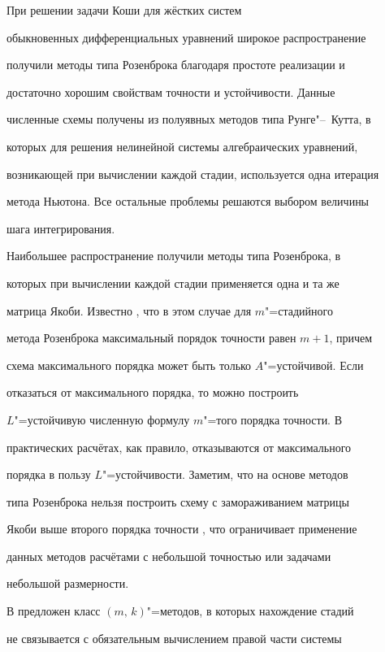  При решении задачи Коши для жёстких систем

обыкновенных дифференциальных уравнений широкое распространение

получили методы типа Розенброка \cite{Novikov:Ros} благодаря простоте реализации и

достаточно хорошим свойствам точности и устойчивости. Данные

численные схемы получены из полуявных методов типа Рунге"--~Кутта, в

которых для решения нелинейной системы алгебраических уравнений,

возникающей при вычислении каждой стадии, используется одна итерация

метода Ньютона. Все остальные проблемы решаются выбором величины

шага интегрирования.



Наибольшее распространение получили методы типа Розенброка, в

которых при вычислении каждой стадии применяется одна и та же

матрица Якоби. Известно \cite{Novikov:Hai}, что в этом случае для $m$"=стадийного

метода Розенброка максимальный порядок точности равен $m+1$, причем

схема максимального порядка может быть только $A$"=устойчивой. Если

отказаться от максимального порядка, то можно построить

$L$"=устойчивую численную формулу  $m$"=того порядка точности. В

практических расчётах, как правило, отказываются от максимального

порядка в пользу  $L$"=устойчивости. Заметим, что на основе методов

типа Розенброка нельзя построить схему с замораживанием матрицы

Якоби выше второго порядка точности \cite{Novikov:NovDvi}, что ограничивает применение

данных методов расчётами с небольшой точностью или задачами

небольшой размерности.



В \cite{Novikov:NovShitShok} предложен класс $(m,\,k)$"=методов, в которых нахождение стадий

не связывается с обязательным вычислением правой части системы

